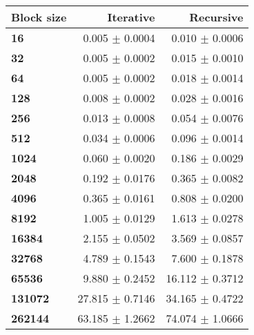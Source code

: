\begin{tabular}{lrr}\toprule
\textbf{Block size}  & \textbf{Iterative} & \textbf{Recursive}\\\midrule
\textbf{16}  & 0.005 $\pm$ 0.0004 & 0.010 $\pm$ 0.0006\\
\textbf{32}  & 0.005 $\pm$ 0.0002 & 0.015 $\pm$ 0.0010\\
\textbf{64}  & 0.005 $\pm$ 0.0002 & 0.018 $\pm$ 0.0014\\
\textbf{128}  & 0.008 $\pm$ 0.0002 & 0.028 $\pm$ 0.0016\\
\textbf{256}  & 0.013 $\pm$ 0.0008 & 0.054 $\pm$ 0.0076\\
\textbf{512}  & 0.034 $\pm$ 0.0006 & 0.096 $\pm$ 0.0014\\
\textbf{1024}  & 0.060 $\pm$ 0.0020 & 0.186 $\pm$ 0.0029\\
\textbf{2048}  & 0.192 $\pm$ 0.0176 & 0.365 $\pm$ 0.0082\\
\textbf{4096}  & 0.365 $\pm$ 0.0161 & 0.808 $\pm$ 0.0200\\
\textbf{8192}  & 1.005 $\pm$ 0.0129 & 1.613 $\pm$ 0.0278\\
\textbf{16384}  & 2.155 $\pm$ 0.0502 & 3.569 $\pm$ 0.0857\\
\textbf{32768}  & 4.789 $\pm$ 0.1543 & 7.600 $\pm$ 0.1878\\
\textbf{65536}  & 9.880 $\pm$ 0.2452 & 16.112 $\pm$ 0.3712\\
\textbf{131072}  & 27.815 $\pm$ 0.7146 & 34.165 $\pm$ 0.4722\\
\textbf{262144} & 63.185 $\pm$ 1.2662 & 74.074 $\pm$ 1.0666\\
\bottomrule
\end{tabular}
